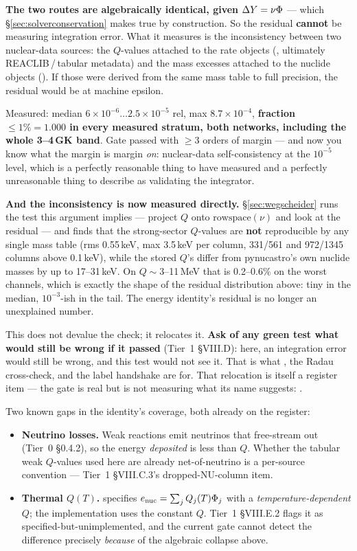 \textbf{The two routes are algebraically identical, given
$\Delta Y = \nu\Phi$} --- which \S\ref{sec:solverconservation} makes true by
construction. So the residual \textbf{cannot} be measuring integration error.
What it measures is the inconsistency between two nuclear-data sources: the
$Q$-values attached to the rate objects (, ultimately
REACLIB\,/\,tabular metadata) and the mass excesses attached to the nuclide
objects (). If those were derived from the same mass table to full
precision, the residual would be at machine epsilon.

Measured: median $6\times10^{-6}\ldots2.5\times10^{-5}$ rel, max
$8.7\times10^{-4}$, \textbf{fraction $\le 1\% = 1.000$ in every measured
stratum, both networks, including the whole 3--4\,GK band}.
 Gate passed with $\ge 3$ orders of margin --- and now
you know what the margin is margin \emph{on}: nuclear-data self-consistency at
the $10^{-5}$ level, which is a perfectly reasonable thing to have measured and
a perfectly unreasonable thing to describe as validating the integrator.

\textbf{And the inconsistency is now measured directly.}
\S\ref{sec:wegscheider} runs the test this argument implies --- project $Q$ onto
$\mathrm{rowspace}(\nu)$ and look at the residual --- and finds that the
strong-sector $Q$-values are \textbf{not} reproducible by any single mass table
(rms 0.55\,keV, max 3.5\,keV per column, 331/561 and 972/1345 columns above
0.1\,keV), while the stored $Q$'s differ from pynucastro's own nuclide masses by
up to 17--31\,keV. On $Q \sim 3$--11\,MeV that is 0.2--0.6\% on the worst
channels, which is exactly the shape of the residual distribution above: tiny in
the median, $10^{-3}$-ish in the tail. The energy identity's residual is no
longer an unexplained number.

This does not devalue the check; it relocates it. \textbf{Ask of any green test
what would still be wrong if it passed} (Tier~1 \S VIII.D): here, an integration
error would still be wrong, and this test would not see it. That is what
, the Radau cross-check, and the label handshake are for.
That relocation is itself a register item --- the gate is real but is not
measuring what its name suggests: .

Two known gaps in the identity's coverage, both already on the register:

\begin{itemize}
\item \textbf{Neutrino losses.} Weak reactions emit neutrinos that free-stream
  out (Tier~0 \S0.4.2), so the energy \emph{deposited} is less than $Q$. Whether
  the tabular weak $Q$-values used here are already net-of-neutrino is a
  per-source convention --- Tier~1 \S VIII.C.3's dropped-NU-column item.
\item \textbf{Thermal $Q(T)$.}  specifies
  $e_{\mathrm{nuc}} = \sum_j Q_j(T)\Phi_j$ with a \emph{temperature-dependent} $Q$; the
  implementation uses the constant $Q$. Tier~1 \S VIII.E.2 flags it as
  specified-but-unimplemented, and the current gate cannot detect the difference
  precisely \emph{because} of the algebraic collapse above.
\end{itemize}

